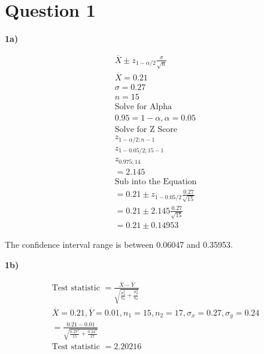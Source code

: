 \documentclass[oneside, a4paper]{article}
\begin{document}


\pagestyle{fancy}
\fancyhf{}

\newpage

\setcounter{secnumdepth}{-1}
\section{Question 1}

\textbf{1a)} 

\begin{equation*}
    \begin{split}
       \overline{X} \pm z_{1 - \alpha / 2} \frac{\sigma}{\sqrt{n}} \\ 
       \overline{X} = 0.21 \\
       \sigma = 0.27 \\
       n = 15 \\
       \text{Solve for Alpha} \\
       0.95 = 1 - \alpha, \alpha = 0.05 \\
       \text{Solve for Z Score} \\
       z_{1 - \alpha /2; n - 1} \\
       z_{1 - 0.05 / 2; 15 - 1} \\
        z_{0.975; 14} \\
        = 2.145 \\
        \text{Sub into the Equation} \\
       = 0.21 \pm z_{1-0.05/2} \frac{0.27}{\sqrt{15}} \\ 
       = 0.21 \pm 2.145 \frac{0.27}{\sqrt{15}} \\
       = 0.21 \pm 0.14953
    \end{split}
\end{equation*}

The confidence interval range is between 0.06047 and 0.35953.

\newpage
\textbf{1b)}

\begin{equation*}
    \begin{split}
        \text{Test statistic } = \frac{\overline{X} - \overline{Y}}{\sqrt{\frac{\sigma_x^2}{n_1} + \frac{\sigma_y^2}{n_2}}} \\
        \overline{X} = 0.21, \overline{Y} = 0.01, n_1 = 15, n_2 = 17, \sigma_x = 0.27, \sigma_y = 0.24 \\
        = \frac{0.21 - 0.01}{\sqrt{\frac{0.27^2}{15} + \frac{0.24^2}{17}}} \\ 
        \text{Test statistic } = 2.20216
    \end{split}
\end{equation*}
\end{document}

